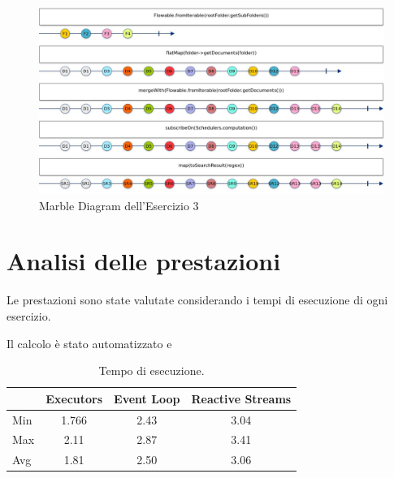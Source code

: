 \documentclass[a4paper]{article}
\begin{document}
\begin{figure}[H]

    \centering

    \includegraphics[width=\linewidth, height=\textheight,keepaspectratio]{ReactiveStreams}

    \caption{Marble Diagram dell'Esercizio 3}

    \label{fig:event-loop}

\end{figure}

\section{Analisi delle prestazioni}\label{analisi-delle-prestazioni}

Le prestazioni sono state valutate considerando i tempi di esecuzione di ogni esercizio.

Il calcolo \`e stato automatizzato e

\begin{table}[H]

\centering

\label{my-label}

\begin{tabular}{l|ccc}
\hline
    & Executors & Event Loop & Reactive Streams \\ \hline
Min & 1.766     & 2.43       & 3.04             \\
Max & 2.11      & 2.87       & 3.41             \\
Avg & 1.81      & 2.50       & 3.06             \\ \hline
\end{tabular}

\caption{Tempo di esecuzione.}

\label{Tabella speedup del sistema}

\end{table}

\end{document}
